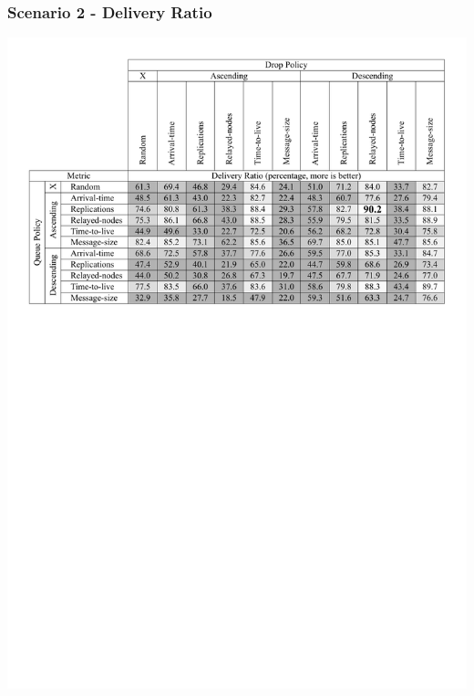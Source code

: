 \begin{frame}
  \frametitle{Scenario 2 - Delivery Ratio}
  \begin{center}
   \includegraphics[width=1.0\textwidth]{fig/tables/scenario2_part1.pdf}
  \end{center}
\end{frame}

